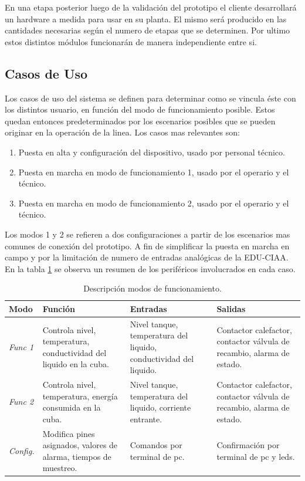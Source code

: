 En una etapa posterior luego de la validación del prototipo el cliente desarrollará un hardware a medida para usar en su planta. El mismo será producido en las cantidades necesarias según el numero de etapas que se determinen. Por ultimo estos distintos módulos funcionarán de manera independiente entre si.



\subsection{ Casos de Uso }
\label{subsec:casos_de_uso}
Los casos de uso del sistema se definen para determinar como se vincula éste con los distintos usuario, en función del modo de funcionamiento posible. Estos quedan entonces predeterminados por los escenarios posibles que se pueden originar en la operación de la linea. Los casos mas relevantes son:

\begin{enumerate}
	\item Puesta en alta y configuración del dispositivo, usado por personal técnico.
	\item Puesta en marcha en modo de funcionamiento 1, usado por el operario y el técnico.
	\item Puesta en marcha en modo de funcionamiento 2, usado por el operario y el técnico.
\end{enumerate}

Los modos 1 y 2 se refieren a dos configuraciones a partir de los escenarios mas comunes de conexión del prototipo. A fin de simplificar la puesta en marcha en campo y por la limitación de numero de entradas analógicas de la EDU-CIAA.
En la tabla \ref{modos_funcionamiento} se observa un resumen de los periféricos involucrados en cada caso.

\begin{table}[h!]
\begin{flushleft}
\begin{tabular}{|m{}|m{4cm}|m{4cm}|m{4cm}|} \hline
{\textbf{Modo}} & {\textbf{Función}} & {\textbf{Entradas}} & {\textbf{Salidas}}\\ \hline
{\textit{Func 1}} & {Controla nivel, temperatura, conductividad del liquido en la cuba.} & { Nivel tanque, temperatura del liquido, conductividad del liquido.} & {Contactor calefactor, contactor válvula de recambio, alarma de estado.} \\ \hline
{\textit{Func 2}} & {Controla nivel, temperatura, energía consumida en la cuba.} & {Nivel tanque, temperatura del liquido, corriente entrante.} & {Contactor calefactor, contactor válvula de recambio, alarma de estado.} \\ \hline
{\textit{Config.}} & {Modifica pines asignados, valores de alarma, tiempos de muestreo.} & {Comandos por terminal de pc.} & {Confirmación por terminal de pc y leds.} \\ \hline
\end{tabular}
\end{flushleft}
\caption{Descripción modos de funcionamiento.}
\label{modos_funcionamiento}
\end{table}

